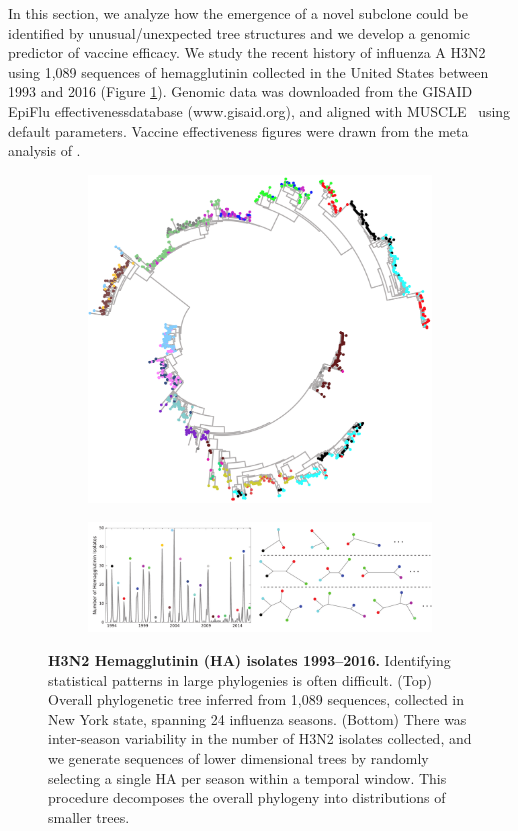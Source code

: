 \documentclass[a4paper,11pt]{article}
\begin{document}
In this section, we analyze how the emergence of a novel subclone
could be identified by unusual/unexpected tree structures and we
develop a genomic predictor of vaccine efficacy.
We study the recent history of influenza A H3N2 using 1,089 sequences of hemagglutinin collected in the United States between 1993 and 2016 (Figure \ref{fig:flu_HA_sampling}).
Genomic data was downloaded from the GISAID EpiFlu effectivenessdatabase (www.gisaid.org), and aligned with MUSCLE~\cite{edgar2004muscle} using default parameters.
Vaccine effectiveness figures were drawn from the meta analysis of \cite{gupta2006quantifying}.

\begin{figure}
    \begin{subfigure}{\linewidth}
    \centering
    \includegraphics[width=0.8\linewidth]{../figures/influenza_HA_tree.png}
    \end{subfigure}
    
    \begin{subfigure}{\linewidth}
    \centering
    \includegraphics[width=\linewidth]{../figures/influenza_seasonal_sampling.pdf}
    \end{subfigure}

    \caption{{\bf H3N2 Hemagglutinin (HA) isolates 1993--2016.} Identifying statistical patterns in large phylogenies is often difficult. (Top) Overall phylogenetic tree inferred from 1,089 sequences, collected in New York state, spanning 24 influenza seasons. (Bottom) There was inter-season variability in the number of H3N2 isolates collected, and we generate sequences of lower dimensional trees by randomly selecting a single HA per season within a temporal window. This procedure decomposes the overall phylogeny into distributions of smaller trees.}
    \label{fig:flu_HA_sampling}
\end{figure}
\end{document}
